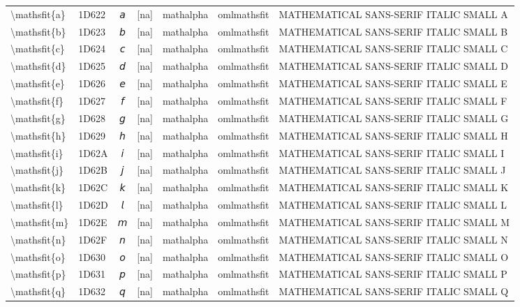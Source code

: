 \documentclass[a4paper,landscape]{article}
\begin{document}
\begin{longtable}{llcclll}
\textbackslash{}mathsfit\{a\} & 1D622 & 𝘢 & [na] & mathalpha & omlmathsfit & MATHEMATICAL SANS-SERIF ITALIC SMALL A \\
\textbackslash{}mathsfit\{b\} & 1D623 & 𝘣 & [na] & mathalpha & omlmathsfit & MATHEMATICAL SANS-SERIF ITALIC SMALL B \\
\textbackslash{}mathsfit\{c\} & 1D624 & 𝘤 & [na] & mathalpha & omlmathsfit & MATHEMATICAL SANS-SERIF ITALIC SMALL C \\
\textbackslash{}mathsfit\{d\} & 1D625 & 𝘥 & [na] & mathalpha & omlmathsfit & MATHEMATICAL SANS-SERIF ITALIC SMALL D \\
\textbackslash{}mathsfit\{e\} & 1D626 & 𝘦 & [na] & mathalpha & omlmathsfit & MATHEMATICAL SANS-SERIF ITALIC SMALL E \\
\textbackslash{}mathsfit\{f\} & 1D627 & 𝘧 & [na] & mathalpha & omlmathsfit & MATHEMATICAL SANS-SERIF ITALIC SMALL F \\
\textbackslash{}mathsfit\{g\} & 1D628 & 𝘨 & [na] & mathalpha & omlmathsfit & MATHEMATICAL SANS-SERIF ITALIC SMALL G \\
\textbackslash{}mathsfit\{h\} & 1D629 & 𝘩 & [na] & mathalpha & omlmathsfit & MATHEMATICAL SANS-SERIF ITALIC SMALL H \\
\textbackslash{}mathsfit\{i\} & 1D62A & 𝘪 & [na] & mathalpha & omlmathsfit & MATHEMATICAL SANS-SERIF ITALIC SMALL I \\
\textbackslash{}mathsfit\{j\} & 1D62B & 𝘫 & [na] & mathalpha & omlmathsfit & MATHEMATICAL SANS-SERIF ITALIC SMALL J \\
\textbackslash{}mathsfit\{k\} & 1D62C & 𝘬 & [na] & mathalpha & omlmathsfit & MATHEMATICAL SANS-SERIF ITALIC SMALL K \\
\textbackslash{}mathsfit\{l\} & 1D62D & 𝘭 & [na] & mathalpha & omlmathsfit & MATHEMATICAL SANS-SERIF ITALIC SMALL L \\
\textbackslash{}mathsfit\{m\} & 1D62E & 𝘮 & [na] & mathalpha & omlmathsfit & MATHEMATICAL SANS-SERIF ITALIC SMALL M \\
\textbackslash{}mathsfit\{n\} & 1D62F & 𝘯 & [na] & mathalpha & omlmathsfit & MATHEMATICAL SANS-SERIF ITALIC SMALL N \\
\textbackslash{}mathsfit\{o\} & 1D630 & 𝘰 & [na] & mathalpha & omlmathsfit & MATHEMATICAL SANS-SERIF ITALIC SMALL O \\
\textbackslash{}mathsfit\{p\} & 1D631 & 𝘱 & [na] & mathalpha & omlmathsfit & MATHEMATICAL SANS-SERIF ITALIC SMALL P \\
\textbackslash{}mathsfit\{q\} & 1D632 & 𝘲 & [na] & mathalpha & omlmathsfit & MATHEMATICAL SANS-SERIF ITALIC SMALL Q \\

\end{longtable}
\end{document}
